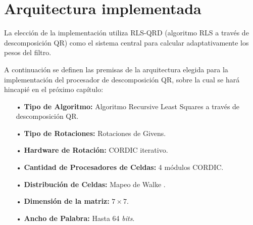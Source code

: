 \section{Arquitectura implementada}

La elección de la implementación utiliza RLS-QRD (algoritmo RLS a través de descomposición QR) como el sistema central para calcular adaptativamente los pesos del filtro.

A continuación se definen las premisas de la arquitectura elegida para la implementación del procesador de descomposición QR, sobre la cual se hará hincapié en el próximo capítulo:

\begin{itemize}
\item[•] \textbf{Tipo de Algoritmo:} Algoritmo Recursive Least Squares a través de descomposición QR.
\item[•] \textbf{Tipo de Rotaciones:} Rotaciones de Givens.
\item[•] \textbf{Hardware de Rotación:} CORDIC iterativo.
\item[•] \textbf{Cantidad de Procesadores de Celdas:} 4 módulos CORDIC.
\item[•] \textbf{Distribución de Celdas:} Mapeo de Walke \cite{Walke}.
\item[•] \textbf{Dimensión de la matriz:} $7 \times 7$.
\item[•] \textbf{Ancho de Palabra:} Hasta 64 \textit{bits}.
\end{itemize}